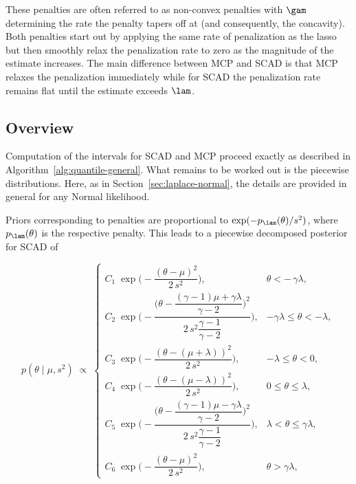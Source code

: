 These penalties are often referred to as non-convex penalties with $\gam$ determining the rate the penalty tapers off at (and consequently, the concavity). Both penalties start out by applying the same rate of penalization as the lasso but then smoothly relax the penalization rate to zero as the magnitude of the estimate increases. The main difference between MCP and SCAD is that MCP relaxes the penalization immediately while for SCAD the penalization rate remains flat until the estimate exceeds $\lam$.

\subsection{Overview}

Computation of the intervals for SCAD and MCP proceed exactly as described in Algorithm~\ref{alg:quantile-general}. What remains to be worked out is the piecewise distributions. Here, as in Section~\ref{sec:laplace-normal}, the details are provided in general for any Normal likelihood.

Priors corresponding to penalties are proportional to $\exp(-p_\lam(\theta) / s^2)$, where $p_\lam(\theta)$ is the respective penalty. This leads to a piecewise decomposed posterior for SCAD of

\[
p(\theta \mid \mu, s^2)
\;\propto\;
\begin{cases}
  C_{1}\;
  \exp\!\Big(-\dfrac{(\theta-\mu)^2}{2\,s^2}\Big),
  & \theta < -\,\gamma\lambda,\\[2ex]

  C_{2}\;
  \exp\!\Bigg(
    -\dfrac{\Big(\theta - \dfrac{(\gamma-1)\mu + \gamma\lambda}{\gamma-2}\Big)^{\!2}}
            {2\,s^2 \dfrac{\gamma-1}{\gamma-2}}
  \Bigg),
  & -\gamma\lambda \le \theta < -\lambda,\\[3ex]

  C_{3}\;
  \exp\!\Big(-\dfrac{(\theta-(\mu+\lambda))^2}{2\,s^2}\Big),
  & -\lambda \le \theta < 0,\\[2ex]

  C_{4}\;
  \exp\!\Big(-\dfrac{(\theta-(\mu-\lambda))^2}{2\,s^2}\Big),
  & 0 \le \theta \le \lambda,\\[2ex]

  C_{5}\;
  \exp\!\Bigg(
    -\dfrac{\Big(\theta - \dfrac{(\gamma-1)\mu - \gamma\lambda}{\gamma-2}\Big)^{\!2}}
            {2\,s^2 \dfrac{\gamma-1}{\gamma-2}}
  \Bigg),
  & \lambda < \theta \le \gamma\lambda,\\[3ex]

  C_{6}\;
  \exp\!\Big(-\dfrac{(\theta-\mu)^2}{2\,s^2}\Big),
  & \theta > \gamma\lambda,
\end{cases}
\]

